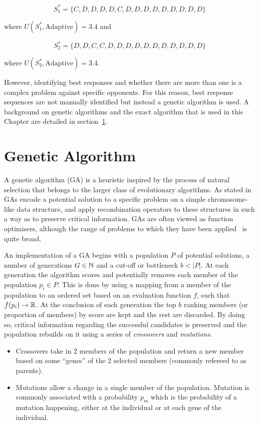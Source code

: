 \[S_{1}^* = \{C, D, D, D, D, C, D, D, D, D, D, D, D, D, D\}\]

where \(U(S_{1}^*, \text{Adaptive}) = 3.4\) and

\[S_{2}^* = \{D, D, C, C, D, D, D, D, D, D, D, D, D, D, D\}\]

where \(U(S_{2}^*, \text{Adaptive}) = 3.4\).

However, identifying best responses and whether there are more than one is
a complex problem against specific opponents.
For this reason, best response sequences are not manually identified
but instead a genetic algorithm is used. A background on genetic algorithms and
the exact algorithm that is used in this Chapter are detailed in
section~\ref{section:genetic_algorithm}.

\section{Genetic Algorithm}\label{section:genetic_algorithm}

A genetic algorithm (GA) is a heuristic inspired by the process of natural
selection that belongs to the larger class of evolutionary algorithms. As stated
in~\cite{Whitley1994} GAs encode a potential solution to a
specific problem on a simple chromosome-like data structure, and apply
recombination operators to these structures in such a way as to preserve
critical information. GAs are often viewed as function
optimisers, although the range of problems to which they have been
applied~\cite{Hou1994, Jones1997, Yang1998} is quite broad.

An implementation of a GA begins with a population \(P\) of
potential solutions, a number of generations \(G \in \mathbb{N}\) and a cut-off or
bottleneck \(b < |P|\). At each generation the algorithm scores and potentially
removes each member of the population \(p_i \in P\). This is done by using a
mapping from a member of the population to an ordered set based on an evaluation
function \(f\), such that \(f(p_i) \to \mathbb{R}\). At the conclusion of each
generation the top \(b\) ranking members (or proportion of members) by score are
kept and the rest are discarded. By doing so, critical information regarding
the successful candidates is preserved and the population rebuilds on it using a
series of \textit{crossovers} and \textit{mutations}.

\begin{itemize}
    \item Crossovers take in 2 members of the population and return a new member
    based on some ``genes'' of the 2 selected members (commonly refereed to as parents).
    \item Mutations allow a change in a single member of the population. Mutation
    is commonly associated with a probability \(p_m\) which is the probability
    of a mutation happening, either at the individual or at each gene of the
    individual.
\end{itemize}

